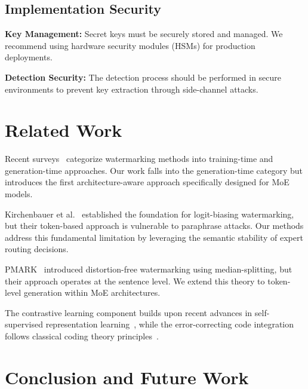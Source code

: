 \documentclass[letterpaper,twocolumn,10pt]{article}
\begin{document}
\subsection{Implementation Security}

\textbf{Key Management:} Secret keys must be securely stored and managed. We recommend using hardware security modules (HSMs) for production deployments.

\textbf{Detection Security:} The detection process should be performed in secure environments to prevent key extraction through side-channel attacks.

\section{Related Work}

Recent surveys~\cite{christ2023watermarking,li2023survey} categorize watermarking methods into training-time and generation-time approaches. Our work falls into the generation-time category but introduces the first architecture-aware approach specifically designed for MoE models.

Kirchenbauer et al.~\cite{kirchenbauer2023watermark} established the foundation for logit-biasing watermarking, but their token-based approach is vulnerable to paraphrase attacks. Our methods address this fundamental limitation by leveraging the semantic stability of expert routing decisions.

PMARK~\cite{pmark2024} introduced distortion-free watermarking using median-splitting, but their approach operates at the sentence level. We extend this theory to token-level generation within MoE architectures.

The contrastive learning component builds upon recent advances in self-supervised representation learning~\cite{chen2020simple}, while the error-correcting code integration follows classical coding theory principles~\cite{macwilliams1977theory}.

\section{Conclusion and Future Work}
\end{document}
